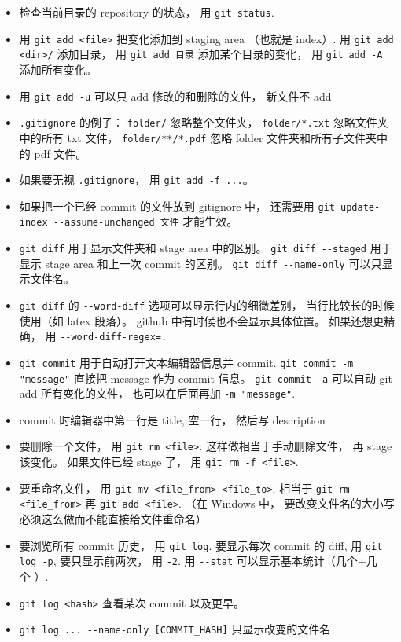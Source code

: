 \begin{itemize}
\item 检查当前目录的 repository 的状态， 用 \verb|git status|. 
\item 用 \verb|git add <file>| 把变化添加到 staging area （也就是 index）. 用 \verb|git add <dir>/| 添加目录， 用 \verb|git add 目录| 添加某个目录的变化， 用 \verb|git add -A| 添加所有变化。
\item 用 \verb|git add -u| 可以只 add 修改的和删除的文件， 新文件不 add
\item \verb|.gitignore| 的例子： \verb|folder/| 忽略整个文件夹， \verb|folder/*.txt| 忽略文件夹中的所有 txt 文件， \verb|folder/**/*.pdf| 忽略 folder 文件夹和所有子文件夹中的 pdf 文件。
\item 如果要无视 \verb|.gitignore|， 用 \verb|git add -f ...|。
\item 如果把一个已经 commit 的文件放到 gitignore 中， 还需要用 \verb|git update-index --assume-unchanged 文件| 才能生效。
\item \verb|git diff| 用于显示文件夹和 stage area 中的区别。 \verb|git diff --staged| 用于显示 stage area 和上一次 commit 的区别。 \verb|git diff --name-only| 可以只显示文件名。
\item \verb|git diff| 的 \verb|--word-diff| 选项可以显示行内的细微差别， 当行比较长的时候使用（如 latex 段落）。 github 中有时候也不会显示具体位置。 如果还想更精确， 用 \verb|--word-diff-regex=.|
\item \verb|git commit| 用于自动打开文本编辑器信息并 commit. \verb|git commit -m "message"| 直接把 message 作为 commit 信息。 \verb|git commit -a| 可以自动 git add 所有变化的文件， 也可以在后面再加 \verb|-m "message"|.
\item commit 时编辑器中第一行是 title, 空一行， 然后写 description
\item 要删除一个文件， 用 \verb|git rm <file>|. 这样做相当于手动删除文件， 再 stage 该变化。 如果文件已经 stage 了， 用 \verb|git rm -f <file>|.
\item 要重命名文件， 用 \verb|git mv <file_from> <file_to>|, 相当于 \verb|git rm <file_from>| 再 \verb|git add <file>|. （在 Windows 中， 要改变文件名的大小写必须这么做而不能直接给文件重命名）
\item 要浏览所有 commit 历史， 用 \verb|git log|. 要显示每次 commit 的 diff, 用 \verb|git log -p|, 要只显示前两次， 用 \verb|-2|. 用 \verb|--stat| 可以显示基本统计（几个+几个-）.
\item \verb|git log <hash>| 查看某次 commit 以及更早。
\item \verb|git log ... --name-only [COMMIT_HASH]| 只显示改变的文件名

\end{itemize}
